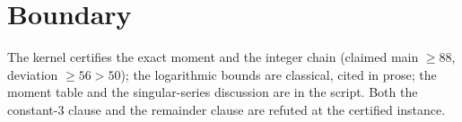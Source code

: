 \documentclass[11pt]{article}
\begin{document}
\section{Boundary}

The kernel certifies the exact moment and the integer chain
(claimed main $\ge 88$, deviation $\ge 56 > 50$); the logarithmic
bounds are classical, cited in prose; the moment table and the
singular-series discussion are in the script.  Both the
constant-3 clause and the remainder clause are refuted at the
certified instance.
\end{document}
